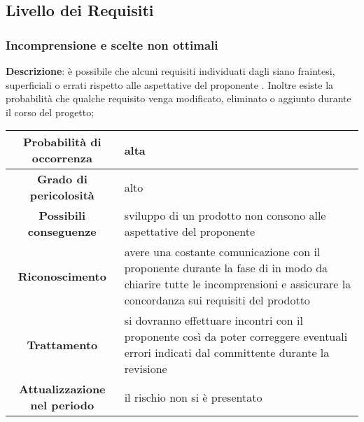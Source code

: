 \documentclass[PianoDiProgetto.tex]{subfiles}
\begin{document}
	\subsection{Livello dei Requisiti}
		\subsubsection{Incomprensione e scelte non ottimali}
			\label{sec:lr}
			
			\textbf{Descrizione}: è possibile che alcuni requisiti individuati dagli \ANP{} siano fraintesi, superficiali o errati rispetto alle aspettative del proponente \PROPONENTE{}. Inoltre esiste la probabilità che qualche requisito venga modificato, eliminato o aggiunto durante il corso del progetto;
			
			\begin{center}
				\begin{tabular}{ | c | p{10cm} |}
					\hline
					\textbf{Probabilità di occorrenza} & alta  \\ \hline
					\textbf{Grado di pericolosità} & alto \\ \hline
					\textbf{Possibili conseguenze} & sviluppo di un prodotto non consono alle aspettative del proponente \\ \hline
					\textbf{Riconoscimento} & avere una costante comunicazione con il proponente \PROPONENTE{} durante la fase di \ARdoc{} in modo da chiarire tutte le incomprensioni e assicurare la concordanza sui requisiti del prodotto \\ \hline
					\textbf{Trattamento} & si dovranno effettuare incontri con il proponente \PROPONENTE{} così da poter correggere eventuali errori indicati dal committente durante la revisione \\ \hline
					\textbf{Attualizzazione nel periodo} &  il rischio non si è presentato \\
					\hline	
				\end{tabular}
			\end{center}
				
	
\end{document}
